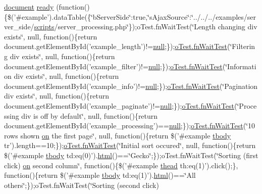 \begin{DoxyCompactItemize}
\hyperlink{outside_events_8js_aa14f8e0338cced6720590fd2ea13bd4b}{document} \hyperlink{onhold_24__server-side_2__zero__config_8js_a0f00e87567a0f4fd387b5bb7761baff2}{ready} (function()\{\$('\#example').data\+Table(\{\char`\"{}b\+Server\+Side\char`\"{}\+:true,\char`\"{}s\+Ajax\+Source\char`\"{}\+:\char`\"{}../../../examples/server\+\_\+side/\hyperlink{tinymce_8jquery_8dev_8js_a09066d4d580eeec222f858d588b4cdef}{scripts}/server\+\_\+processing.\+php\char`\"{}\});o\+Test.\+fn\+Wait\+Test(\char`\"{}Length changing div exists\char`\"{}, null, function()\{return document.\+get\+Element\+By\+Id('example\+\_\+length')!=\hyperlink{validate_8js_afb8e110345c45e74478894341ab6b28e}{null};\});\hyperlink{onhold_24__server-side_2__zero__config_8js_ab25c4d596771c0133cdc45178ce72c3d}{o\+Test.\+fn\+Wait\+Test}(\char`\"{}Filtering div exists\char`\"{}, null, function()\{return document.\+get\+Element\+By\+Id('example\+\_\+filter')!=\hyperlink{validate_8js_afb8e110345c45e74478894341ab6b28e}{null};\});\hyperlink{onhold_24__server-side_2__zero__config_8js_ab25c4d596771c0133cdc45178ce72c3d}{o\+Test.\+fn\+Wait\+Test}(\char`\"{}Information div exists\char`\"{}, null, function()\{return document.\+get\+Element\+By\+Id('example\+\_\+info')!=\hyperlink{validate_8js_afb8e110345c45e74478894341ab6b28e}{null};\});\hyperlink{onhold_24__server-side_2__zero__config_8js_ab25c4d596771c0133cdc45178ce72c3d}{o\+Test.\+fn\+Wait\+Test}(\char`\"{}Pagination div exists\char`\"{}, null, function()\{return document.\+get\+Element\+By\+Id('example\+\_\+paginate')!=\hyperlink{validate_8js_afb8e110345c45e74478894341ab6b28e}{null};\});\hyperlink{onhold_24__server-side_2__zero__config_8js_ab25c4d596771c0133cdc45178ce72c3d}{o\+Test.\+fn\+Wait\+Test}(\char`\"{}Processing div is off by default\char`\"{}, null, function()\{return document.\+get\+Element\+By\+Id('example\+\_\+processing')==\hyperlink{validate_8js_afb8e110345c45e74478894341ab6b28e}{null};\});\hyperlink{onhold_24__server-side_2__zero__config_8js_ab25c4d596771c0133cdc45178ce72c3d}{o\+Test.\+fn\+Wait\+Test}(\char`\"{}10 rows shown \hyperlink{fullpage_2plugin_8min_8js_a1cfa98b7fed2aaf9fee3b68dbb7f9497}{on} the first page\char`\"{}, null, function()\{return \$('\#example \hyperlink{core_8constructor_8js_a99b0542c7c50fe8757c55bf9dac5f3be}{tbody} tr').length==10;\});\hyperlink{onhold_24__server-side_2__zero__config_8js_ab25c4d596771c0133cdc45178ce72c3d}{o\+Test.\+fn\+Wait\+Test}(\char`\"{}Initial sort occured\char`\"{}, null, function()\{return \$('\#example \hyperlink{core_8constructor_8js_a99b0542c7c50fe8757c55bf9dac5f3be}{tbody} td\+:eq(0)').\hyperlink{tinymce_8jquery_8dev_8js_ac2090bcf2ff968c0083d5de53a6544f3}{html}()==\char`\"{}Gecko\char`\"{};\});o\+Test.\+fn\+Wait\+Test(\char`\"{}Sorting (first click) \hyperlink{fullpage_2plugin_8min_8js_a1cfa98b7fed2aaf9fee3b68dbb7f9497}{on} second column\char`\"{}, function()\{\$('\#example \hyperlink{core_8constructor_8js_a856be760b6816c9591ce69f0a2b43693}{thead} th\+:eq(1)').click();\}, function()\{return \$('\#example \hyperlink{core_8constructor_8js_a99b0542c7c50fe8757c55bf9dac5f3be}{tbody} td\+:eq(1)').\hyperlink{tinymce_8jquery_8dev_8js_ac2090bcf2ff968c0083d5de53a6544f3}{html}()==\char`\"{}All others\char`\"{};\});o\+Test.\+fn\+Wait\+Test(\char`\"{}Sorting (second click) 
\end{DoxyCompactItemize}
